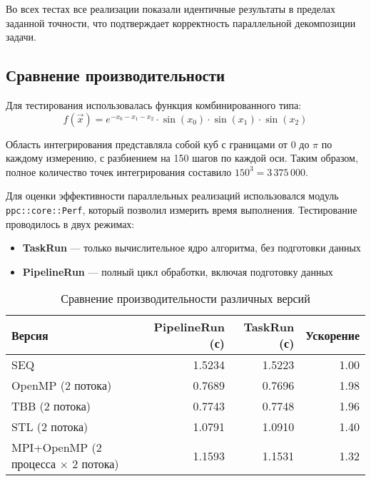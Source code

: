 \documentclass[a4paper,12pt]{article}
\begin{document}
  Во всех тестах все реализации показали идентичные результаты в пределах заданной точности, что подтверждает корректность параллельной декомпозиции задачи.

  \subsection{Сравнение производительности}\label{subsec:performance}

  Для тестирования использовалась функция комбинированного типа:
  \[
    f(\vec{x}) = e^{-x_0 - x_1 - x_2} \cdot \sin(x_0) \cdot \sin(x_1) \cdot \sin(x_2)
  \]

  Область интегрирования представляла собой куб с границами от $0$ до $\pi$ по каждому измерению, с разбиением на 150 шагов по каждой оси.
  Таким образом, полное количество точек интегрирования составило $150^3 = 3\,375\,000$.

  Для оценки эффективности параллельных реализаций использовался модуль \texttt{ppc::core::Perf}, который позволил измерить время выполнения.
  Тестирование проводилось в двух режимах:
  \begin{itemize}
    \item \textbf{TaskRun} --- только вычислительное ядро алгоритма, без подготовки данных
    \item \textbf{PipelineRun} --- полный цикл обработки, включая подготовку данных
  \end{itemize}

  \begin{table}[H]
    \centering
    \begin{tabular}{lrrr}
      \toprule
      \textbf{Версия}                           & \textbf{PipelineRun (с)} & \textbf{TaskRun (с)} & \textbf{Ускорение} \\
      \midrule
      SEQ                                       & 1.5234                   & 1.5223               & 1.00               \\
      OpenMP (2 потока)                         & 0.7689                   & 0.7696               & 1.98               \\
      TBB (2 потока)                            & 0.7743                   & 0.7748               & 1.96               \\
      STL (2 потока)                            & 1.0791                   & 1.0910               & 1.40               \\
      MPI+OpenMP (2 процесса $\times$ 2 потока) & 1.1593                   & 1.1531               & 1.32               \\
      \bottomrule
    \end{tabular}
    \caption{Сравнение производительности различных версий}\label{tab:performance}
  \end{table}
\end{document}
